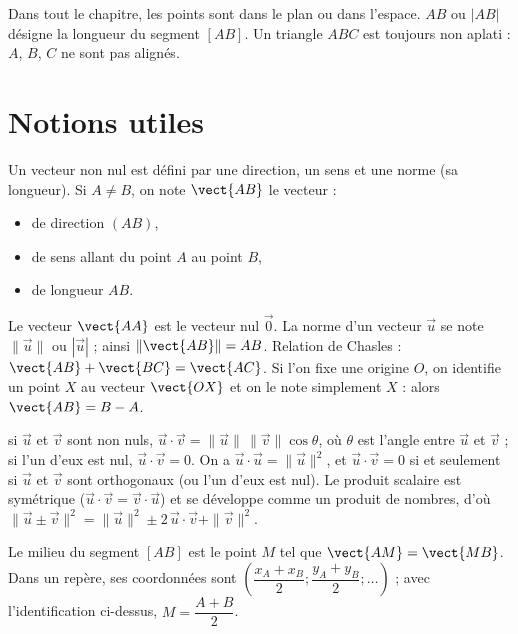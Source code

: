 \documentclass[11pt]{article}
\begin{document}

Dans tout le chapitre, les points sont dans le plan ou dans l'espace. $AB$ ou $|AB|$ désigne la longueur du segment $[AB]$. Un triangle $ABC$ est toujours non aplati : $A$, $B$, $C$ ne sont pas alignés.

\section{Notions utiles}\label{sec:notions}

\begin{definition}[Vecteur]\label{def:vecteur}
Un vecteur non nul est défini par une direction, un sens et une norme (sa longueur). Si $A\neq B$, on note $\vect{AB}$ le vecteur :
    \begin{itemize}
        \item de direction $(AB)$,
        \item de sens allant du point $A$ au point $B$,
        \item de longueur $AB$.
    \end{itemize}
Le vecteur $\vect{AA}$ est le vecteur nul $\vec{0}$. La norme d'un vecteur $\vec{u}$ se note $\|\vec{u}\|$ ou $|\vec{u}|$ ; ainsi $\|\vect{AB}\|=AB$.
Relation de Chasles : $\vect{AB} + \vect{BC} = \vect{AC}$. Si l'on fixe une origine $O$, on identifie un point $X$ au vecteur $\vect{OX}$ et on le note simplement $X$ : alors $\vect{AB} = B - A$.
\end{definition}

\begin{definition}\label{def:produit-scalaire}
si $\vec{u}$ et $\vec{v}$ sont non nuls, $\vec{u}\cdot\vec{v}=\|\vec{u}\|\,\|\vec{v}\|\cos\theta$, où $\theta$ est l'angle entre $\vec{u}$ et $\vec{v}$ ; si l'un d'eux est nul, $\vec{u}\cdot\vec{v}=0$. On a $\vec{u}\cdot\vec{u}=\|\vec{u}\|^2$, et $\vec{u}\cdot\vec{v}=0$ si et seulement si $\vec{u}$ et $\vec{v}$ sont orthogonaux (ou l'un d'eux est nul). Le produit scalaire est symétrique ($\vec{u}\cdot\vec{v}=\vec{v}\cdot\vec{u}$) et se développe comme un produit de nombres, d'où $\|\vec{u}\pm\vec{v}\|^2=\|\vec{u}\|^2\pm2\,\vec{u}\cdot\vec{v}+\|\vec{v}\|^2$.
\end{definition}

\begin{definition}\label{def:milieu}
Le milieu du segment $[AB]$ est le point $M$ tel que $\vect{AM} = \vect{MB}$. Dans un repère, ses coordonnées sont $ \left( \dfrac{x_A+x_B}{2} ; \dfrac{y_A+y_B}{2} ; \ldots \right)$ ; avec l'identification ci-dessus, $M=\dfrac{A+B}{2}$.
\end{definition}
\end{document}
